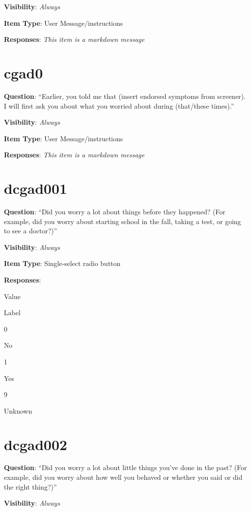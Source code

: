 \documentclass[]{book}
\begin{document}
\textbf{Visibility}: \emph{Always}

\textbf{Item Type}: User Message/instructions

\textbf{Responses}: \emph{This item is a markdown message}

\hypertarget{cgad0}{%
\section{cgad0}\label{cgad0}}

\textbf{Question}: ``Earlier, you told me that (insert endorsed symptoms from screener). I will first ask you about what you worried about during (that/these times).''

\textbf{Visibility}: \emph{Always}

\textbf{Item Type}: User Message/instructions

\textbf{Responses}: \emph{This item is a markdown message}

\hypertarget{dcgad001}{%
\section{dcgad001}\label{dcgad001}}

\textbf{Question}: ``Did you worry a lot about things before they happened? (For example, did you worry about starting school in the fall, taking a test, or going to see a doctor?)''

\textbf{Visibility}: \emph{Always}

\textbf{Item Type}: Single-select radio button

\textbf{Responses}:

Value

Label

0

No

1

Yes

9

Unknown

\hypertarget{dcgad002}{%
\section{dcgad002}\label{dcgad002}}

\textbf{Question}: ``Did you worry a lot about little things you've done in the past? (For example, did you worry about how well you behaved or whether you said or did the right thing?)''

\textbf{Visibility}: \emph{Always}
\end{document}
